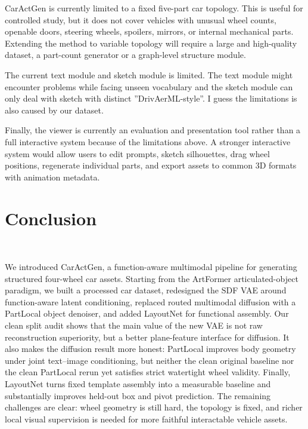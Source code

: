 \documentclass[10pt]{article}
\newcommand{\method}{CarActGen\xspace}
\newcommand{\artformer}{ArtFormer\xspace}
\begin{document}
CarActGen is currently limited to a fixed five-part car topology. This is useful for controlled study, but it does not cover vehicles with unusual wheel counts, openable doors, steering wheels, spoilers, mirrors, or internal mechanical parts. Extending the method to variable topology will require a large and high-quality dataset, a part-count generator or a graph-level structure module.

The current text module and sketch module is limited. The text module might encounter problems while facing unseen vocabulary and the sketch module can only deal with sketch with distinct ”DrivAerML-style”. I guess the limitations is also caused by our dataset.

Finally, the viewer is currently an evaluation and presentation tool rather than a full interactive system because of the limitations above. A stronger interactive system would allow users to edit prompts, sketch silhouettes, drag wheel positions, regenerate individual parts, and export assets to common 3D formats with animation metadata.

\section{Conclusion}

\

We introduced \method, a function-aware multimodal pipeline for generating structured four-wheel car assets. Starting from the \artformer articulated-object paradigm, we built a processed car dataset, redesigned the SDF VAE around function-aware latent conditioning, replaced routed multimodal diffusion with a PartLocal object denoiser, and added LayoutNet for functional assembly. Our clean split audit shows that the main value of the new VAE is not raw reconstruction superiority, but a better plane-feature interface for diffusion. It also makes the diffusion result more honest: PartLocal improves body geometry under joint text--image conditioning, but neither the clean original baseline nor the clean PartLocal rerun yet satisfies strict watertight wheel validity. Finally, LayoutNet turns fixed template assembly into a measurable baseline and substantially improves held-out box and pivot prediction. The remaining challenges are clear: wheel geometry is still hard, the topology is fixed, and richer local visual supervision is needed for more faithful interactable vehicle assets.
\end{document}
